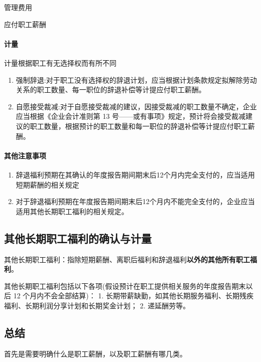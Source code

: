 \documentclass[UTF8,12pt]{ctexart}
\newenvironment{Dr}{%
	\begin{list}{}%
		{
			\setlength{\leftmargin}{2em}
			\setlength{\labelwidth}{2em}
			\setlength{\labelsep}{0pt}
			\setlength{\itemindent}{0pt}
			\setlength{\listparindent}{0pt}
			\setlength{\parsep}{0pt}
			\setlength{\topsep}{0pt}
		}
		\item[\textbf{借：}]
	}{%
	\end{list}
}
\newenvironment{Cr}{%
	\begin{list}{}%
		{
			\setlength{\leftmargin}{3em}
			\setlength{\labelwidth}{2em}
			\setlength{\labelsep}{0pt}
			\setlength{\itemindent}{0pt}
			\setlength{\listparindent}{0pt}
			\setlength{\parsep}{0pt}
			\setlength{\topsep}{0pt}
		}
		\item[\textbf{贷：}]
	}{%
	\end{list}
}
\numberwithin{equation}{section} %
\numberwithin{figure}{section}
\numberwithin{table}{section}
\begin{document}
	\begin{Dr}
		管理费用
	\end{Dr}
	\begin{Cr}
		应付职工薪酬
	\end{Cr}
	
	\paragraph{计量}
	计量根据职工有无选择权而有所不同
	\begin{enumerate}
		\item 强制辞退:对于职工没有选择权的辞退计划，应当根据计划条款规定拟解除劳动关系的职工数量、每一职位的辞退补偿等计提应付职工薪酬。
		
		\item 自愿接受裁减:对于自愿接受裁减的建议，因接受裁减的职工数量不确定，企业应当根据《企业会计准则第 13 号——或有事项》规定，预计将会接受裁减建议的职工数量，根据预计的职工数量和每一职位的辞退补偿等计提应付职工薪酬。
	\end{enumerate}

	\paragraph{其他注意事项}
	\begin{enumerate}
		\item 辞退福利预期在其确认的年度报告期间期末后12个月内完全支付的，应当适用短期薪酬的相关规定
		
		\item 对于辞退福利预期在年度报告期间期末后12个月内不能完全支付的，企业应当适用其他长期职工福利的相关规定。
	\end{enumerate}


	\subsection{其他长期职工福利的确认与计量}
	其他长期职工福利：指除短期薪酬、离职后福利和辞退福利\textbf{以外的其他所有职工福利}。
	
	其他长期职工福利包括以下各项(假设预计在职工提供相关服务的年度报告期末以后 12 个月内不会全部结算)：
	1.	长期带薪缺勤，如其他长期服务福利、长期残疾福利、长期利润分享计划和长期奖金计划；
	2.	递延酬劳等。
	
	
	\subsection{总结}
	
	首先是需要明确什么是职工薪酬，以及职工薪酬有哪几类。
	
\end{document}
